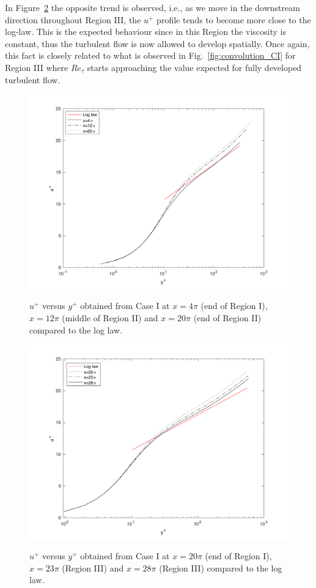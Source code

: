 \documentclass[twocolumn,10pt]{asme2e}
\begin{document}
In Figure~\ref{fig:log_law_CI_downstream} the opposite trend is observed, i.e., as we move in the downstream direction throughout Region III, the \(u^+\) profile tends to become more close to the log-law. This is the expected behaviour since in this Region the viscosity is constant, thus the turbulent flow is now allowed to develop spatially. Once again, this fact is closely related to what is observed in Fig.~\ref{fig:convolution_CI} for Region III where  \(Re_{\tau}\) starts approaching the value expected for fully developed turbulent flow.

\begin{figure}[t]
\centering
\scalebox{0.5}
{\includegraphics{log_law_CI_upstream.pdf}}
\caption{\(u^+\) versus \(y^+\) obtained from Case I at \(x=4{\pi}\) (end of Region I), \(x=12{\pi}\) (middle of Region II) and \(x=20{\pi}\) (end of Region II) compared to the log law.}
\label{fig:log_law_CI_upstream}
\end{figure}

\begin{figure}[t]
\centering
\scalebox{0.5}
{\includegraphics{log_law_CI_downstream.pdf}}
\caption{\(u^+\) versus \(y^+\) obtained from Case I at \(x=20{\pi}\) (end of Region I), \(x=23{\pi}\) (Region III) and \(x=28{\pi}\) (Region III) compared to the log law.}
\label{fig:log_law_CI_downstream}
\end{figure}
\end{document}
